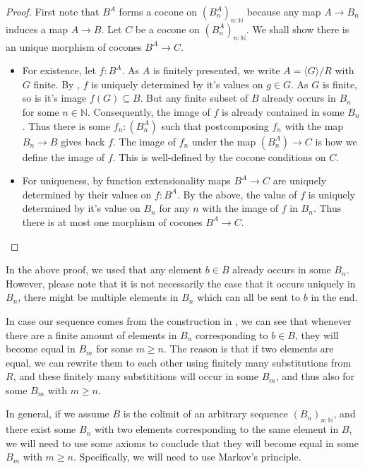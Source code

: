 \begin{proof}
  First note that $B^A$ forms a cocone on $(B_n^A)_{n:\mathbb N}$ 
  because any map $A \to B_n$ induces a map $A \to B$. 
  Let $C$ be a cocone on $(B_n^A)_{n:\mathbb N}$. 
  We shall show there is an unique morphism of cocones $B^A \to C$. 
  \begin{itemize}
    \item For existence, let $f:B^A$. 
      As $A$ is finitely presented, we write $A = \langle G \rangle / R$ with $G$ finite.
      By , $f$ is uniquely determined by it's values on $g\in G$. 
      As $G$ is finite, so is it's image $f(G)\subseteq B$. 
      But any finite subset of $B$ already occurs in $B_n$ for some $n\in\mathbb N$. 
      Consequently, the image of $f$ is already contained in some $B_n$. 
      Thus there is some $f_n:(B_n^A)$ such that postcomposing 
      $f_n$ with the map $B_n \to B$ gives back $f$. 
      The image of $f_n$ under the map $(B_n^A) \to C$ is how we define the image of $f$. 
      This is well-defined by the cocone conditions on $C$. 
    \item 
      For uniqueness, by function extensionality maps $B^A \to C$ are uniquely determined by their values on 
      $f:B^A$. By the above, the value of $f$ is uniquely determined by it's value on $B_n$ for 
      any $n$ with the image of $f$ in $B_n$. Thus there is at most one morphism of cocones $B^A \to C$. 
  \end{itemize}
\end{proof}
\begin{remark}
  In the above proof, we used that any element $b\in B$ already occurs in some $B_n$. 
  However, please note that it is not necessarily the case that it occurs uniquely in $B_n$, 
  there might be multiple elements in $B_n$ which can all be sent to $b$ in the end. 

  In case our sequence comes from the construction in , 
  we can see that whenever there are a finite amount of elements in 
  $B_n$ corresponding to $b\in B$, they will become equal in $B_m$ for some $m\geq n$. 
  The reason is that if two elements are equal, we can rewrite them to each other using finitely many substitutions 
  from $R$, and these finitely many substititions will occur in some $B_m$, and thus also for some $B_m$ with $m\geq n$. 

  In general, if we assume $B$ is the colimit of an arbitrary sequence $(B_n)_{n:\mathbb N}$, 
  and there exist some $B_n$ with two elements corresponding to the same element in $B$, 
  we will need to use some axioms to conclude that they will become equal in some $B_m$ with $m\geq n$. 
  Specifically, we will need to use Markov's principle. 
\end{remark}

